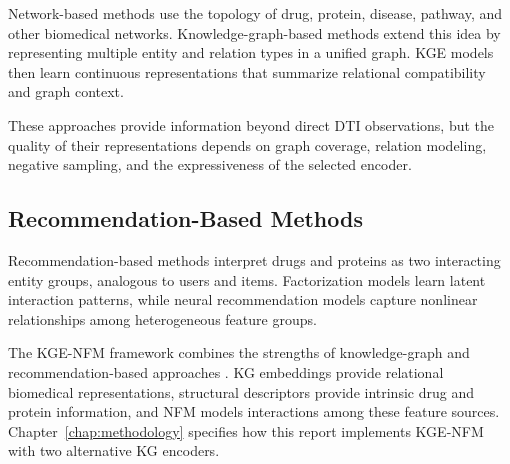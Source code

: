 Network-based methods use the topology of drug, protein, disease, pathway, and
other biomedical networks. Knowledge-graph-based methods extend this idea by
representing multiple entity and relation types in a unified graph. KGE models
then learn continuous representations that summarize relational compatibility
and graph context.

These approaches provide information beyond direct DTI observations, but the
quality of their representations depends on graph coverage, relation modeling,
negative sampling, and the expressiveness of the selected encoder.

\subsection{Recommendation-Based Methods}

Recommendation-based methods interpret drugs and proteins as two interacting
entity groups, analogous to users and items. Factorization models learn latent
interaction patterns, while neural recommendation models capture nonlinear
relationships among heterogeneous feature groups.

The KGE-NFM framework combines the strengths of knowledge-graph and
recommendation-based approaches \cite{ye2021unified}. KG embeddings provide
relational biomedical representations, structural descriptors provide
intrinsic drug and protein information, and NFM models interactions among
these feature sources. Chapter~\ref{chap:methodology} specifies how this report
implements KGE-NFM with two alternative KG encoders.
